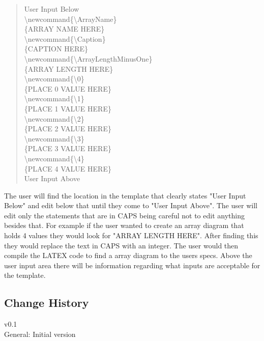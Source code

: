 \documentclass[10pt,a4paper,english]{article}
\begin{document}
\begin{flushleft}
\begin{quote}{\ttfamily \raggedright \noindent
User Input Below~\\
{\textbackslash}newcommand{\{}{\textbackslash}ArrayName{\}}~\\
{\{}ARRAY NAME HERE{\}}~\\
{\textbackslash}newcommand{\{}{\textbackslash}Caption{\}}~\\
{\{}CAPTION HERE{\}}~\\
{\textbackslash}newcommand{\{}{\textbackslash}ArrayLengthMinusOne{\}}~\\
{\{}ARRAY LENGTH HERE{\}}~\\
{\textbackslash}newcommand{\{}{\textbackslash}0{\}}~\\
{\{}PLACE 0 VALUE HERE{\}}~\\
{\textbackslash}newcommand{\{}{\textbackslash}1{\}}~\\
{\{}PLACE 1 VALUE HERE{\}}~\\
{\textbackslash}newcommand{\{}{\textbackslash}2{\}}~\\
{\{}PLACE 2 VALUE HERE{\}}~\\
{\textbackslash}newcommand{\{}{\textbackslash}3{\}}~\\
{\{}PLACE 3 VALUE HERE{\}}~\\
{\textbackslash}newcommand{\{}{\textbackslash}4{\}}~\\
{\{}PLACE 4 VALUE HERE{\}}~\\
User Input Above~\\
}\end{quote}

The user will find the location in the template that clearly states "User Input Below" and edit below that until they come to "User Input Above".  The user will edit only the statements that are in CAPS being careful not to edit anything besides that.  For example if the user wanted to create an array diagram that holds 4 values they would look for "ARRAY LENGTH HERE".  After finding this they would replace the text in CAPS with an integer.  The user would then compile the LATEX code to find a array diagram to the users specs.  Above the user input area there will be information regarding what inputs are acceptable for the template. 


\end{flushleft}

\newpage
\begin{multicols}{2} %

\section*{Change History}
v0.1\\
\indent General: Initial version 
\end{multicols}
\end{document}
